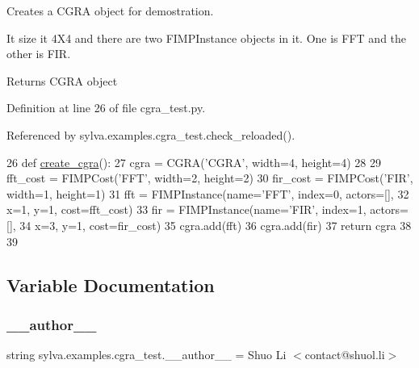 Creates a C\+G\+RA object for demostration. 

It size it 4\+X4 and there are two F\+I\+M\+P\+Instance objects in it. One is {\ttfamily F\+FT} and the other is {\ttfamily F\+IR}.

\begin{DoxyReturn}{Returns}
C\+G\+RA object 
\end{DoxyReturn}


Definition at line 26 of file cgra\+\_\+test.\+py.



Referenced by sylva.\+examples.\+cgra\+\_\+test.\+check\+\_\+reloaded().


\begin{DoxyCode}
26 \textcolor{keyword}{def }\hyperlink{namespacesylva_1_1examples_1_1cgra__test_a09c07ec774ca38d6416db7161605fff9}{create\_cgra}():
27     cgra = CGRA(\textcolor{stringliteral}{'CGRA'}, width=4, height=4)
28 
29     fft\_cost = FIMPCost(\textcolor{stringliteral}{'FFT'}, width=2, height=2)
30     fir\_cost = FIMPCost(\textcolor{stringliteral}{'FIR'}, width=1, height=1)
31     fft = FIMPInstance(name=\textcolor{stringliteral}{'FFT'}, index=0, actors=[],
32                        x=1, y=1, cost=fft\_cost)
33     fir = FIMPInstance(name=\textcolor{stringliteral}{'FIR'}, index=1, actors=[],
34                        x=3, y=1, cost=fir\_cost)
35     cgra.add(fft)
36     cgra.add(fir)
37     \textcolor{keywordflow}{return} cgra
38 
39 
\end{DoxyCode}


\subsection{Variable Documentation}
\mbox{\label{namespacesylva_1_1examples_1_1cgra__test_af0a0ac0774f042da48d4262f540947b4}} 
\subsubsection{\texorpdfstring{\+\_\+\+\_\+author\+\_\+\+\_\+}{\_\_author\_\_}}
{\footnotesize\ttfamily string sylva.\+examples.\+cgra\+\_\+test.\+\_\+\+\_\+author\+\_\+\+\_\+ = \textquotesingle{}Shuo Li $<$contact@shuol.\+li$>$\textquotesingle{}\hspace{0.3cm}{\ttfamily [private]}}




